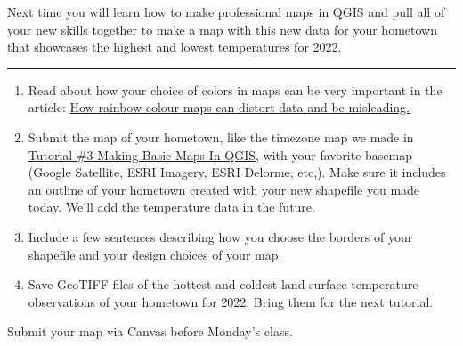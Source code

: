 \documentclass[oneside,a4paper,11pt,explicit]{book}
\begin{document}
	\begin{tcolorbox}[colback=gray!5!white,colframe=blue!65!green,title=Next Tutorial]
		Next time you will learn how to make professional maps in QGIS and pull all of your new skills together to make a map with this new data for your hometown that showcases the highest and lowest temperatures for 2022. 
	\end{tcolorbox}
	
	
	
	\vspace{.25em}
	
	\hrule
	
	\vspace{1 em}
	
	\begin{tcolorbox}[colback=yellow!5!white,colframe=red!80!blue,title= \vspace{.2em} \Large Map of the Week Assignments]
		\large
		\begin{enumerate}
			\item Read about how your choice of colors in maps can be very important in the article: \href{https://theconversation.com/how-rainbow-colour-maps-can-distort-data-and-be-misleading-167159}{How rainbow colour maps can distort data and be misleading.}
			\item Submit the map of your hometown, like the timezone map we made in \href{https://jeremydforsythe.github.io/icecream-tutorials/Tutorial3_MakingBasicMapsInQGIS/Tutorial3_MakingBasicMapsInQGIS.pdf}{Tutorial \#3 Making Basic Maps In QGIS}, with your favorite basemap (Google Satellite, ESRI Imagery, ESRI Delorme, etc,). Make sure it includes an outline of your hometown created with your new shapefile you made today. We'll add the temperature data in the future.  
			\item Include a few sentences describing how you choose the borders of your shapefile and your design choices of your map. 
			\item Save GeoTIFF files of the hottest and coldest land surface temperature observations of your hometown for 2022. Bring them for the next tutorial.
		\end{enumerate}
		
		Submit your map via Canvas before Monday's class.
	\end{tcolorbox}
	
\end{document}
